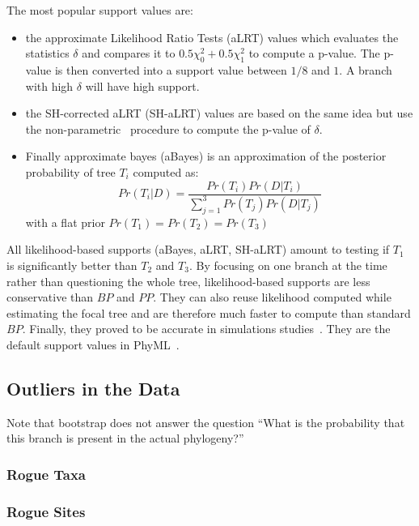 The most popular support values are:
\begin{itemize}
 \item the approximate Likelihood Ratio Tests (aLRT) values which evaluates the statistics $\delta$ and compares it to $0.5\chi^2_0 + 0.5\chi^2_1$ to compute a p-value. The p-value is then converted into a support value between $1/8$ and $1$. A branch with high $\delta$ will have high support. 
 \item the SH-corrected aLRT (SH-aLRT) values are based on the same idea but use the non-parametric~\citet{Shimodaira1999} procedure to compute the p-value of $\delta$.
 \item Finally approximate bayes (aBayes) is an approximation of the posterior probability of tree $T_i$ computed as:
 \[
  Pr(T_i | D) = \frac{Pr(T_i) Pr(D | T_i)}{\sum_{j=1}^3 Pr(T_j) Pr(D | T_j)}
 \]
 with a flat prior $Pr(T_1) = Pr(T_2)= Pr(T_3)$
\end{itemize}

All likelihood-based supports (aBayes, aLRT, SH-aLRT) amount to testing if $T_1$ is significantly better than $T_2$ and $T_3$. By focusing on one branch at the time rather than questioning the whole tree, likelihood-based supports are less conservative than $BP$ and $PP$. They can also reuse likelihood computed while estimating the focal tree and are therefore much faster to compute than standard $BP$. Finally, they proved to be accurate in simulations studies~\citep{Anisimova2011}. They are the default support values in PhyML~\citep{Guindon2003}. 

\subsection{Outliers in the Data} \label{sec:outliers}

Note that bootstrap does not answer the question ``What is the probability that this branch is present in the actual phylogeny?''

\subsubsection{Rogue Taxa} \label{sec:rogue-taxa}

\subsubsection{Rogue Sites} \label{sec:rogue-sites}
